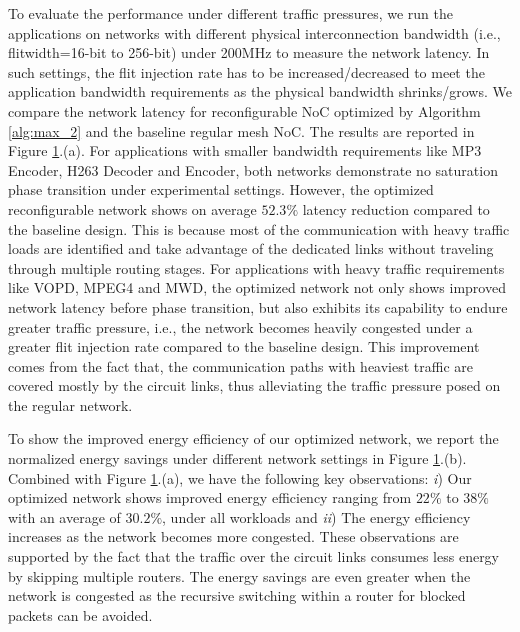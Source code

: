 {{\begin{figure}[htb]
  \label{fig:network}
  \vskip -6.5mm
\end{figure}
\indent To evaluate the performance under different traffic pressures, we run the applications on networks with different physical interconnection bandwidth (i.e., flitwidth=16-bit to 256-bit) under 200MHz to measure the network latency. In such settings, the flit injection rate has to be increased/decreased to meet the application bandwidth requirements as the physical bandwidth shrinks/grows. We compare the network latency for reconfigurable NoC optimized by Algorithm \ref{alg:max_2} and the baseline regular mesh NoC. The results are reported in Figure \ref{fig:network}.(a). For applications with smaller bandwidth requirements like MP3 Encoder, H263 Decoder and Encoder, both networks demonstrate no saturation phase transition under experimental settings. However, the optimized reconfigurable network shows on average $52.3\%$ latency reduction compared to the baseline design. This is because most of the communication with heavy traffic loads are identified and take advantage of the dedicated links without traveling through multiple routing stages.  For applications with heavy traffic requirements like VOPD, MPEG4 and MWD, the optimized network not only shows improved network latency before phase transition, but also exhibits its capability to endure greater traffic pressure, i.e., the network becomes heavily congested under a greater flit injection rate compared to the baseline design. This improvement comes from the fact that, the communication paths with heaviest traffic are covered mostly by the circuit links, thus alleviating the traffic pressure posed on the regular network.

 To show the improved energy efficiency of our optimized network, we report the normalized energy savings under different network settings in Figure \ref{fig:network}.(b). Combined with Figure \ref{fig:network}.(a), we have the following key observations: \textit{i}) Our optimized network shows improved energy efficiency ranging from $22\%$ to $38\%$ with an average of $30.2\%$, under all workloads and \textit{ii}) The energy efficiency increases as the network becomes more congested. These observations are supported by the fact that the traffic over the circuit links consumes less energy by skipping multiple routers. The energy savings are even greater when the network is congested as the recursive switching within a router for blocked packets can be avoided.
}}
